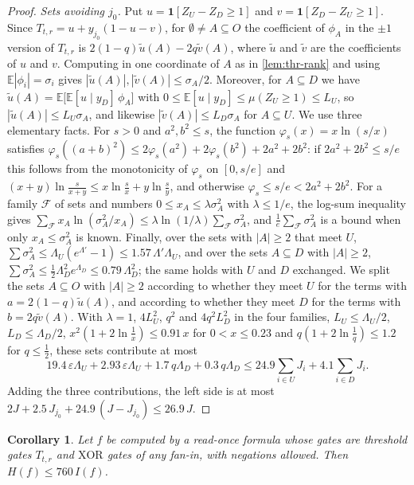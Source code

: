\documentclass[11pt]{amsart}
\newtheorem{corollary}[theorem]{Corollary}
\theoremstyle{definition}
\theoremstyle{remark}
\newcommand{\E}{\mathbb{E}}
\begin{document}
\begin{proof}
\emph{Sets avoiding $j_0$.} Put $u=\mathbf 1[Z_U-Z_D\ge1]$ and $v=\mathbf 1[Z_D-Z_U\ge1]$. Since
$T_{t,r}=u+y_{j_0}(1-u-v)$, for $\emptyset\ne A\subseteq O$ the coefficient of $\phi_A$ in the $\pm1$ version of
$T_{t,r}$ is $2(1-q)\tilde u(A)-2q\tilde v(A)$, where $\tilde u$ and $\tilde v$ are the coefficients of $u$ and $v$.
Computing in one coordinate of $A$ as in \cref{lem:thr-rank} and using $\E|\phi_i|=\sigma_i$ gives
$|\tilde u(A)|,|\tilde v(A)|\le\sigma_A/2$. Moreover, for $A\subseteq D$ we have
$\tilde u(A)=\E\bigl[\E[u\mid y_D]\,\phi_A\bigr]$ with $0\le\E[u\mid y_D]\le\mu(Z_U\ge1)\le L_U$, so
$|\tilde u(A)|\le L_U\sigma_A$, and likewise $|\tilde v(A)|\le L_D\sigma_A$ for $A\subseteq U$. We use three
elementary facts. For $s>0$ and $a^2,b^2\le s$, the function $\varphi_s(x)=x\ln(s/x)$ satisfies
$\varphi_s((a+b)^2)\le2\varphi_s(a^2)+2\varphi_s(b^2)+2a^2+2b^2$: if $2a^2+2b^2\le s/e$ this follows from the
monotonicity of $\varphi_s$ on $[0,s/e]$ and $(x+y)\ln\frac s{x+y}\le x\ln\frac sx+y\ln\frac sy$, and otherwise
$\varphi_s\le s/e<2a^2+2b^2$. For a family $\mathcal F$ of sets and numbers $0\le x_A\le\lambda\sigma_A^2$ with
$\lambda\le1/e$, the log-sum inequality gives $\sum_{\mathcal F}x_A\ln(\sigma_A^2/x_A)\le\lambda\ln(1/\lambda)
\sum_{\mathcal F}\sigma_A^2$, and $\frac1e\sum_{\mathcal F}\sigma_A^2$ is a bound when only $x_A\le\sigma_A^2$ is
known. Finally, over the sets with $|A|\ge2$ that meet $U$, $\sum\sigma_A^2\le\Lambda_U(e^{\Lambda'}-1)\le
1.57\,\Lambda'\Lambda_U$, and over the sets $A\subseteq D$ with $|A|\ge2$,
$\sum\sigma_A^2\le\frac12\Lambda_D^2e^{\Lambda_D}\le0.79\,\Lambda_D^2$; the same holds with $U$ and $D$ exchanged. We
split the sets $A\subseteq O$ with $|A|\ge2$ according to whether they meet $U$ for the terms with
$a=2(1-q)\tilde u(A)$, and according to whether they meet $D$ for the terms with $b=2q\tilde v(A)$. With $\lambda=1$,
$4L_U^2$, $q^2$ and $4q^2L_D^2$ in the four families, $L_U\le\Lambda_U/2$, $L_D\le\Lambda_D/2$,
$x^2(1+2\ln\frac1x)\le0.91\,x$ for $0<x\le0.23$ and $q(1+2\ln\frac1q)\le1.2$ for $q\le\frac12$, these sets contribute
at most
\[
19.4\,\varepsilon\Lambda_U+2.93\,\varepsilon\Lambda_U+1.7\,q\Lambda_D+0.3\,q\Lambda_D
\le24.9\sum_{i\in U}J_i+4.1\sum_{i\in D}J_i.
\]
Adding the three contributions, the left side is at most $2J+2.5\,J_{j_0}+24.9\,(J-J_{j_0})\le26.9\,J$.
\end{proof}

\begin{corollary}\label{cor:thr-formula}
Let $f$ be computed by a read-once formula whose gates are threshold gates $T_{t,r}$ and $\mathrm{XOR}$ gates of any
fan-in, with negations allowed. Then $H(f)\le760\,I(f)$.
\end{corollary}
\end{document}
